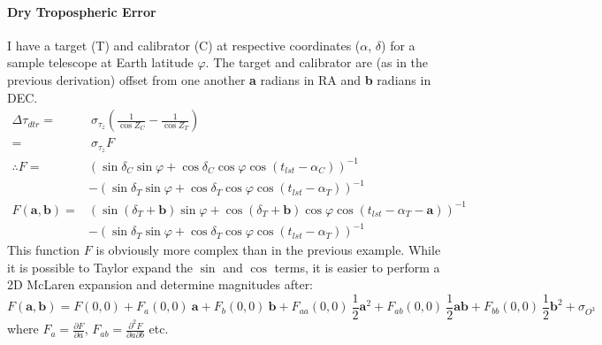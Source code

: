 	\paragraph{Dry Tropospheric Error} \label{app:tropoplaneerror} I have a target (T) and calibrator (C) at respective coordinates ($\alpha$, $\delta$) for a sample telescope at Earth latitude $\varphi$. The target and calibrator are (as in the previous derivation) offset from one another \textbf{a} radians in RA and \textbf{b} radians in DEC.
	\begin{equation}
		\begin{split}
		\Delta\tau_{dtr} =&~\sigma_{\tau_z} \left(\frac{1}{\cos Z_C}-\frac{1}{\cos Z_T}\right)\\
						 =&~\sigma_{\tau_z} F \\
		 \therefore	F =   &\left(\sin\delta_C\sin\varphi+\cos\delta_C\cos\varphi\cos(t_{lst}-\alpha_C)\right)^{-1} \\
			              & -\left(\sin\delta_T\sin\varphi+\cos\delta_T\cos\varphi\cos(t_{lst}-\alpha_T)\right)^{-1} \\ 
	          F(\textbf{a},\textbf{b}) =
	                      &\left(\sin(\delta_T+\textbf{b})\sin\varphi+\cos(\delta_T+\textbf{b})\cos\varphi\cos(t_{lst}-\alpha_T-\textbf{a})\right)^{-1} \\ 			   &-\left(\sin\delta_T\sin\varphi+\cos\delta_T\cos\varphi\cos(t_{lst}-\alpha_T)\right)^{-1}
		\end{split}
	\end{equation}
	This function $F$ is obviously more complex than in the previous example. While it is possible to Taylor expand the $\sin$ and $\cos$ terms, it is easier to perform a 2D McLaren expansion and determine magnitudes after:
	\begin{equation*}
		F(\textbf{a},\textbf{b}) = F(0,0) + F_a(0,0)~\textbf{a} + F_b(0,0)~\textbf{b} + F_{aa}(0,0)~\frac{1}{2}\textbf{a}^2 +  F_{ab}(0,0)~\frac{1}{2}\textbf{ab} +  F_{bb}(0,0)~\frac{1}{2}\textbf{b}^2 + \sigma_{O^3}
	\end{equation*} where $F_{a}=\frac{\partial F}{\partial a}$,  $F_{ab}=\frac{\partial^2 F}{\partial a \partial b}$ etc.
	
